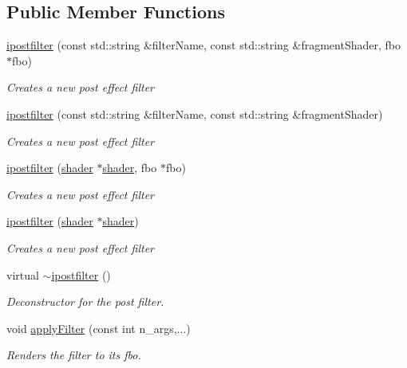 \subsection*{Public Member Functions}
\begin{DoxyCompactItemize}
\item 
\hyperlink{classflounder_1_1ipostfilter_a2c792b5d59c2b47b1f3b75a7a1404df0}{ipostfilter} (const std\+::string \&filter\+Name, const std\+::string \&fragment\+Shader, fbo $\ast$fbo)
\begin{DoxyCompactList}\small\item\em Creates a new post effect filter \end{DoxyCompactList}\item 
\hyperlink{classflounder_1_1ipostfilter_adb158fccda942f9d05ec2c21ea3f8654}{ipostfilter} (const std\+::string \&filter\+Name, const std\+::string \&fragment\+Shader)
\begin{DoxyCompactList}\small\item\em Creates a new post effect filter \end{DoxyCompactList}\item 
\hyperlink{classflounder_1_1ipostfilter_a45622b81739ebad815b69526a878b054}{ipostfilter} (\hyperlink{classflounder_1_1shader}{shader} $\ast$\hyperlink{classflounder_1_1shader}{shader}, fbo $\ast$fbo)
\begin{DoxyCompactList}\small\item\em Creates a new post effect filter \end{DoxyCompactList}\item 
\hyperlink{classflounder_1_1ipostfilter_a90d67fde6f8fe6ff4e3a7dba0fab418d}{ipostfilter} (\hyperlink{classflounder_1_1shader}{shader} $\ast$\hyperlink{classflounder_1_1shader}{shader})
\begin{DoxyCompactList}\small\item\em Creates a new post effect filter \end{DoxyCompactList}\item 
virtual \hyperlink{classflounder_1_1ipostfilter_aca15b2f21a5f07ddcff5dcad764e137c}{$\sim$ipostfilter} ()
\begin{DoxyCompactList}\small\item\em Deconstructor for the post filter. \end{DoxyCompactList}\item 
void \hyperlink{classflounder_1_1ipostfilter_a34cced83864d9d6b1c664a0337cd97b2}{apply\+Filter} (const int n\+\_\+args,...)
\begin{DoxyCompactList}\small\item\em Renders the filter to its fbo. \end{DoxyCompactList}\item 

\end{DoxyCompactItemize}
